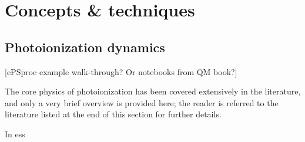 \section{Concepts \& techniques}

\subsection{Photoionization dynamics} 
[ePSproc example walk-through? Or notebooks from QM book?]

The core physics of photoionization has been covered extensively in the literature, and only a very brief overview is provided here; the reader is referred to the literature listed at the end of this section for further details.

In ess
